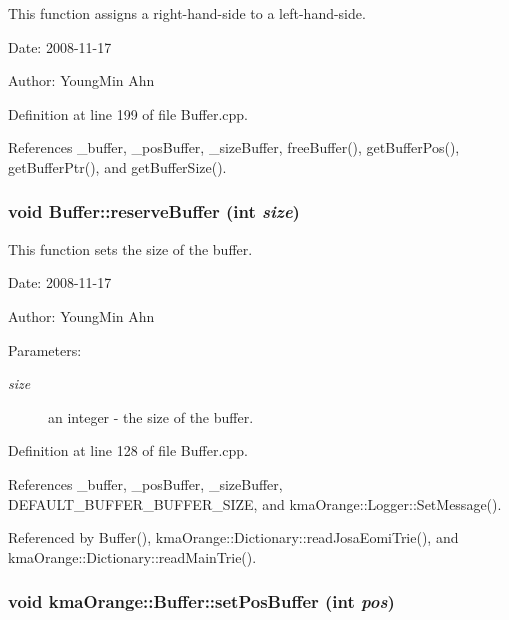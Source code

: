 This function assigns a right-hand-side to a left-hand-side. 

\begin{Desc}
\item[Date:]2008-11-17 \end{Desc}
\begin{Desc}
\item[Author:]YoungMin Ahn \end{Desc}


Definition at line 199 of file Buffer.cpp.

References \_\-buffer, \_\-posBuffer, \_\-sizeBuffer, freeBuffer(), getBufferPos(), getBufferPtr(), and getBufferSize().\hypertarget{classkmaOrange_1_1Buffer_4afbe5aa986d4f15d9ae93358a716e62}{
\subsubsection[{reserveBuffer}]{\setlength{\rightskip}{0pt plus 5cm}void Buffer::reserveBuffer (int {\em size})}}
\label{classkmaOrange_1_1Buffer_4afbe5aa986d4f15d9ae93358a716e62}


This function sets the size of the buffer. 

\begin{Desc}
\item[Date:]2008-11-17 \end{Desc}
\begin{Desc}
\item[Author:]YoungMin Ahn \end{Desc}
\begin{Desc}
\item[Parameters:]
\begin{description}
\item[{\em size}]an integer - the size of the buffer. \end{description}
\end{Desc}


Definition at line 128 of file Buffer.cpp.

References \_\-buffer, \_\-posBuffer, \_\-sizeBuffer, DEFAULT\_\-BUFFER\_\-BUFFER\_\-SIZE, and kmaOrange::Logger::SetMessage().

Referenced by Buffer(), kmaOrange::Dictionary::readJosaEomiTrie(), and kmaOrange::Dictionary::readMainTrie().\hypertarget{classkmaOrange_1_1Buffer_22aa8b5ca6b4a4135762883479bc7d16}{
\subsubsection[{setPosBuffer}]{\setlength{\rightskip}{0pt plus 5cm}void kmaOrange::Buffer::setPosBuffer (int {\em pos})}}
\label{classkmaOrange_1_1Buffer_22aa8b5ca6b4a4135762883479bc7d16}


